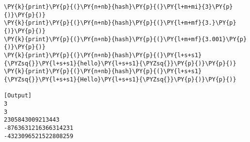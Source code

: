 \begin{Verbatim}[label=\makebox{\url{https://bitbucket.org/lbaldini/programming/src/tip/snippets/hashing.py}},commandchars=\\\{\}]
\PY{k}{print}\PY{p}{(}\PY{n+nb}{hash}\PY{p}{(}\PY{l+m+mi}{3}\PY{p}{)}\PY{p}{)}
\PY{k}{print}\PY{p}{(}\PY{n+nb}{hash}\PY{p}{(}\PY{l+m+mf}{3.}\PY{p}{)}\PY{p}{)}
\PY{k}{print}\PY{p}{(}\PY{n+nb}{hash}\PY{p}{(}\PY{l+m+mf}{3.001}\PY{p}{)}\PY{p}{)}
\PY{k}{print}\PY{p}{(}\PY{n+nb}{hash}\PY{p}{(}\PY{l+s+s1}{\PYZsq{}}\PY{l+s+s1}{hello}\PY{l+s+s1}{\PYZsq{}}\PY{p}{)}\PY{p}{)}
\PY{k}{print}\PY{p}{(}\PY{n+nb}{hash}\PY{p}{(}\PY{l+s+s1}{\PYZsq{}}\PY{l+s+s1}{Hello}\PY{l+s+s1}{\PYZsq{}}\PY{p}{)}\PY{p}{)}

[Output]
3
3
2305843009213443
-8763631216366314231
-4323096521522808259
\end{Verbatim}